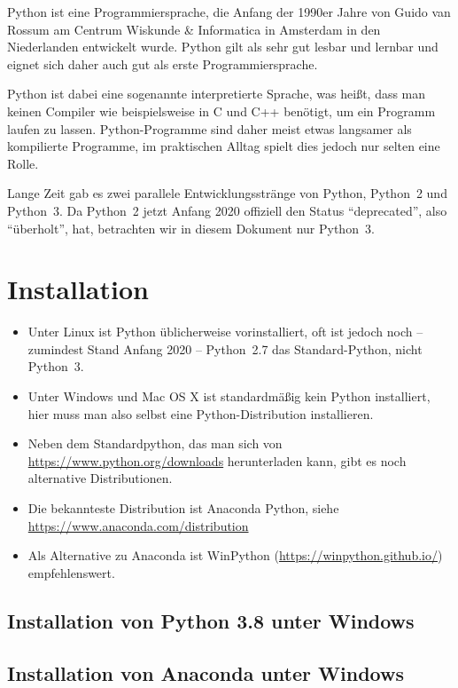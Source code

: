\documentclass[12pt,ngerman]{scrreprt}
\begin{document}
Python ist eine Programmiersprache, die Anfang der 1990er Jahre von Guido van Rossum am Centrum Wiskunde \& Informatica in Amsterdam in den Niederlanden entwickelt wurde. Python gilt als sehr gut lesbar und lernbar und eignet sich daher auch gut als erste Programmiersprache. 

Python ist dabei eine sogenannte interpretierte Sprache, was heißt, dass man keinen Compiler wie beispielsweise in C und C++ benötigt, um ein Programm laufen zu lassen. Python-Programme sind daher meist etwas langsamer als kompilierte Programme, im praktischen Alltag spielt dies jedoch nur selten eine Rolle.

Lange Zeit gab es zwei parallele Entwicklungsstränge von Python, Python~2 und Python~3. Da Python~2 jetzt Anfang 2020 offiziell den Status \enquote{deprecated}, also  \enquote{überholt}, hat, betrachten wir in diesem Dokument nur Python~3.

\chapter{Installation}

\begin{itemize}
	\item Unter Linux ist Python üblicherweise vorinstalliert, oft ist jedoch noch -- zumindest Stand Anfang 2020 -- Python~2.7 das Standard-Python, nicht Python~3. 
	\item Unter Windows und Mac OS X ist standardmäßig kein Python installiert, hier muss man also selbst eine Python-Distribution installieren.
\item Neben dem Standardpython, das man sich von \url{https://www.python.org/downloads} herunterladen kann, gibt es noch alternative Distributionen.
	\item Die bekannteste Distribution ist Anaconda Python, siehe \url{https://www.anaconda.com/distribution}
	\item Als Alternative zu Anaconda ist WinPython (\url{https://winpython.github.io/}) empfehlenswert.
\end{itemize}

\section{Installation von Python 3.8 unter Windows}


\section{Installation von Anaconda unter Windows}
\end{document}
